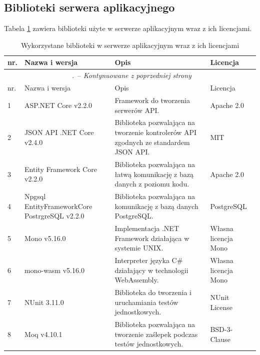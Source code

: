 \documentclass[a4paper,11pt,twoside]{report}
\renewcommand*{\thetable}{\arabic{chapter}.\arabic{table}}
\theoremstyle{definition}
\begin{document}
        \subsection{Biblioteki serwera aplikacyjnego}
        Tabela \ref{biblioteki-serwer} zawiera biblioteki użyte w serwerze aplikacyjnym wraz z ich licencjami.
        
    \begin{longtable}{| p{} | p{} | p{} | p{} |}
        \caption{Wykorzystane biblioteki w serwerze aplikacyjnym wraz z ich licencjami}
        \label{biblioteki-serwer} \\
        \hline
        nr. & Nazwa i wersja & Opis & Licencja \\ \hline
        \endfirsthead
        \multicolumn{4}{c}{\tablename\ \thetable\ -- \textit{Kontynuowane z poprzedniej strony}} \\
        \hline
        nr. & Nazwa i wersja & Opis & Licencja \\ \hline
        \endhead
        
        1 & ASP.NET Core v2.2.0 & Framework do tworzenia serwerów API. & Apache 2.0 \\ \hline
        2 & JSON API .NET Core v2.4.0 & Biblioteka pozwalająca na tworzenie kontrolerów API zgodnych ze standardem JSON API. & MIT \\ \hline
        3 & Entity Framework Core v2.2.0 & Biblioteka pozwalająca na łatwą komunikację z bazą danych z poziomu kodu. & Apache 2.0 \\ \hline
        4 & Npgsql EntityFrameworkCore PostrgreSQL v2.2.0 & Biblioteka pozwalająca na komunikację z bazą danych PostgreSQL. & PostgreSQL \cite{licencja-postgresql} \\ \hline
        5 & Mono v5.16.0 & Implementacja .NET Framework działająca w systemie UNIX. & Własna licencja Mono \cite{licencja-mono} \\ \hline
        6 & mono-wasm v5.16.0 & Interpreter języka C\# działający w technologii WebAssembly. & Własna licencja Mono \cite{licencja-mono} \\ \hline
        7 & NUnit 3.11.0 & Biblioteka do tworzenia i uruchamiania testów jednostkowych. & NUnit License \cite{licencja-nunit} \\ \hline
        8 & Moq v4.10.1 & Biblioteka pozwalająca na tworzenie zaślepek podczas testów jednostkowych. & BSD-3-Clause \\ \hline
    \end{longtable}
        
\end{document}

